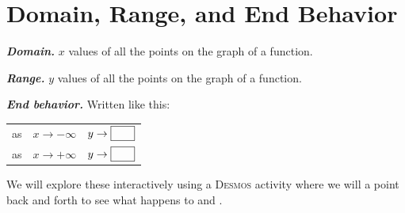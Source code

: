 \section{Domain, Range, and End Behavior}

{
    \small
    \begin{tcbraster}[
        raster columns=3,
        colback=white,
        raster equal height,
        raster after skip = 3\baselineskip,
        ]
        \begin{tcolorbox}
            \raggedright
            {\bfseries\itshape Domain.} $x$ values 
            of all the {points on the graph}
            of a function.
        \end{tcolorbox}
        \begin{tcolorbox}
            \raggedright
            {\bfseries\itshape Range.} $y$ values 
            of all the {points on the graph}
            of a function.
        \end{tcolorbox}
        \begin{tcolorbox}
            \raggedright
            {\bfseries\itshape End behavior.} Written like this:
            \renewcommand{\arraystretch}{1.25}
            \begin{tabular}{lll}
                as & $x \rightarrow -\infty$ & $y \rightarrow \text{\fbox{\phantom{999}}}$ \\
                as & $x \rightarrow +\infty$ & $y \rightarrow \text{\fbox{\phantom{999}}}$ \\
            \end{tabular}
        \end{tcolorbox}
    \end{tcbraster}
}

We will explore these interactively
using a {\scshape Desmos} activity
where we will  a point back and forth 
to see what happens to  and .

